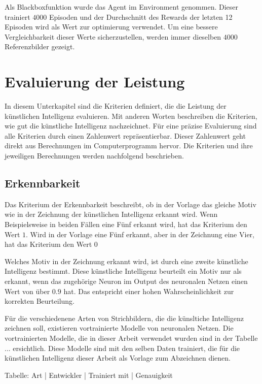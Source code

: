 Als Blackboxfunktion wurde das Agent im Environment genommen. Dieser trainiert
$4000$ Episoden und der Durchschnitt des Rewards der letzten 12 Episoden wird
als Wert zur optimierung verwendet. Um eine bessere Vergleichbarkeit dieser
Werte sicherzustellen, werden immer dieselben $4000$ Referenzbilder gezeigt.



\section{Evaluierung der Leistung}
In diesem Unterkapitel sind die Kriterien definiert, die die Leistung der
künstlichen Intelligenz evaluieren. Mit anderen Worten beschreiben die
Kriterien, wie gut die künstliche Intelligenz nachzeichnet. Für eine präzise
Evaluierung sind alle Kriterien durch einen Zahlenwert repräsentierbar. Dieser
Zahlenwert geht direkt aus Berechnungen im Computerprogramm hervor. Die
Kriterien und ihre jeweiligen Berechnungen werden nachfolgend beschrieben.

\subsection{Erkennbarkeit}
Das Kriterium der Erkennbarkeit beschreibt, ob in der Vorlage das gleiche Motiv
wie in der Zeichnung der künstlichen Intelligenz erkannt wird. Wenn
Beispielsweise in beiden Fällen eine Fünf erkannt wird, hat das Kriterium den
Wert $1$. Wird in der Vorlage eine Fünf erkannt, aber in der Zeichnung eine
Vier, hat das Kriterium den Wert $0$

Welches Motiv in der Zeichnung erkannt wird, ist durch eine zweite künstliche
Intelligenz bestimmt. Diese künstliche Intelligenz beurteilt ein Motiv nur als
erkannt, wenn das zugehörige Neuron im Output des neuronalen Netzen einen Wert
von über $0.9$ hat. Das entspricht einer hohen Wahrscheinlichkeit zur korrekten
Beurteilung.

Für die verschiedenene Arten von Strichbildern, die die künsltiche Intelligenz
zeichnen soll, existieren vortrainierte Modelle von neuronalen Netzen. Die
vortrainierten Modelle, die in dieser Arbeit verwendet wurden sind in der
Tabelle ... ersichtlich. Diese Modelle sind mit den selben Daten trainiert, die für
die künstlichen Intelligenz dieser Arbeit als Vorlage zum Abzeichnen dienen.

Tabelle:
Art       |       Entwickler      |     Trainiert mit     |      Genauigkeit 

